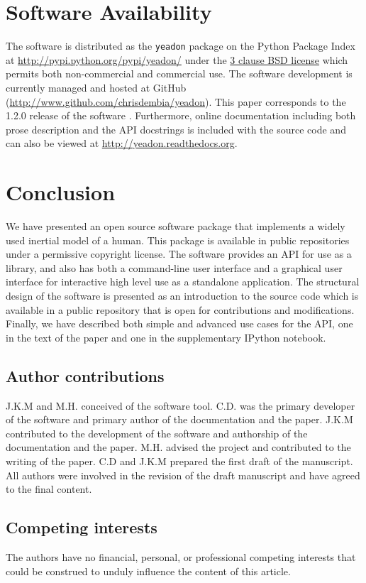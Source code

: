 \documentclass[10pt,a4paper,twocolumn]{article}
\begin{document}
\section*{Software Availability}
The software is distributed as the \verb+yeadon+
package on the Python Package Index at
\url{http://pypi.python.org/pypi/yeadon/} under the \href{http://opensource.org/licenses/BSD-3-Clause}{3 clause BSD
license} which permits both non-commercial and commercial use.
The software development is currently managed and hosted at GitHub (\url{http://www.github.com/chrisdembia/yeadon}). This paper corresponds to the 1.2.0 release of the software \cite{Christopher:11579}. Furthermore, online documentation including both prose description
and the API docstrings is included with the source code and can also be viewed
at \url{http://yeadon.readthedocs.org}.


\section*{Conclusion}
We have presented an open source software package that implements a widely used
inertial model of a human. This package is available in public repositories under a permissive copyright license. The
software provides an API for use as a library, and also has both a command-line
user interface and a graphical user interface for interactive high level use as
a standalone application. The structural design of the software is presented as
an introduction to the source code which is available in a public repository
that is open for contributions and modifications. Finally, we have described both
simple and advanced use cases for the API, one in the text of the paper and one
in the supplementary IPython notebook.

\subsection*{Author contributions}
J.K.M and M.H. conceived of the software tool. C.D. was the primary developer of the
software and primary author of the documentation and the paper. J.K.M contributed to the
development of the software and authorship of the documentation and the paper.
M.H. advised the project and contributed to the writing of the paper. C.D and
J.K.M prepared the first draft of the manuscript. All authors were involved in
the revision of the draft manuscript and have agreed to the final content.

\subsection*{Competing interests}
The authors have no  financial, personal, or professional competing interests that
could be construed to unduly influence the content of this article.
\end{document}
